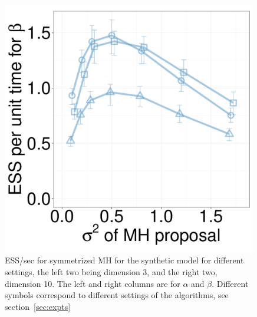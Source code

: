 \begin{figure}[H]
\begin{minipage}[hp]{0.24\linewidth}
	\end{minipage}
  \begin{minipage}[hp]{0.24\linewidth}
  \centering
    \includegraphics [width=0.99\textwidth, angle=0]{figs/new_whole_exp_figs/mh_exp_beta_dim10.pdf}
	\end{minipage}
    \caption{ESS/sec for symmetrized MH for the synthetic model for different settings, the left two being dimension 3, and the right two, dimension 10. The left and right columns are for $\alpha$ and $\beta$. Different symbols correspond to different settings of the algorithms, see section~\ref{sec:expts}}
     \label{fig:mhESS_EXP}
  \end{figure}

